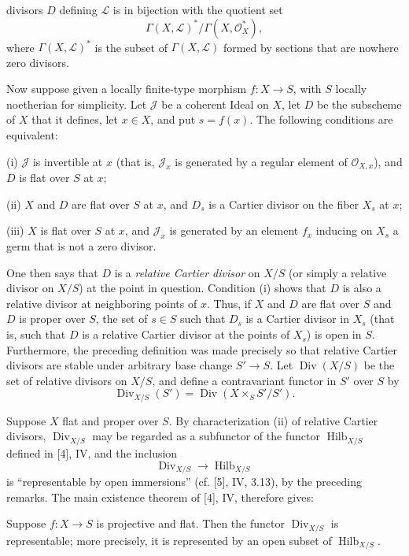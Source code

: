 divisors $D$ defining $\mathcal L$ is in bijection with the quotient set
\[
\Gamma(X,\mathcal L)^*/\Gamma(X,\mathcal O_X^*),
\]
where $\Gamma(X,\mathcal L)^*$ is the subset of $\Gamma(X,\mathcal L)$ formed
by sections that are nowhere zero divisors.

Now suppose given a locally finite-type morphism $f:X\longrightarrow S$, with
$S$ locally noetherian for simplicity. Let $\mathcal J$ be a coherent Ideal on
$X$, let $D$ be the subscheme of $X$ that it defines, let $x\in X$, and put
$s=f(x)$. The following conditions are equivalent:

\noindent (i) $\mathcal J$ is invertible at $x$ (that is, $\mathcal J_x$ is
generated by a regular element of $\mathcal O_{X,x}$), and $D$ is flat over
$S$ at $x$;

\noindent (ii) $X$ and $D$ are flat over $S$ at $x$, and $D_s$ is a Cartier
divisor on the fiber $X_s$ at $x$;

\noindent (iii) $X$ is flat over $S$ at $x$, and $\mathcal J_x$ is generated
by an element $f_x$ inducing on $X_s$ a germ that is not a zero divisor.

One then says that $D$ is a \emph{relative Cartier divisor} on $X/S$ (or simply
a relative divisor on $X/S$) at the point in question. Condition (i) shows
that $D$ is also a relative divisor at neighboring points of $x$. Thus, if $X$
and $D$ are flat over $S$ and $D$ is proper over $S$, the set of $s\in S$ such
that $D_s$ is a Cartier divisor in $X_s$ (that is, such that $D$ is a relative
Cartier divisor at the points of $X_s$) is open in $S$. Furthermore, the
preceding definition was made precisely so that relative Cartier divisors are
stable under arbitrary base change $S'\longrightarrow S$. Let
$\operatorname{Div}(X/S)$ be the set of relative divisors on $X/S$, and define
a contravariant functor in $S'$ over $S$ by
\[
\operatorname{Div}_{X/S}(S')=
\operatorname{Div}(X\times_SS'/S').
\]

Suppose $X$ flat and proper over $S$. By characterization (ii) of relative
Cartier divisors, $\operatorname{Div}_{X/S}$ may be regarded as a subfunctor of
the functor $\operatorname{Hilb}_{X/S}$ defined in [4], IV, and the inclusion
\[
\operatorname{Div}_{X/S}\longrightarrow\operatorname{Hilb}_{X/S}
\]
is “representable by open immersions” (cf. [5], IV, 3.13), by the preceding
remarks. The main existence theorem of [4], IV, therefore gives:

 Suppose $f:X\longrightarrow S$ is projective and
flat. Then the functor $\operatorname{Div}_{X/S}$ is representable; more
precisely, it is represented by an open subset of
$\operatorname{Hilb}_{X/S}$.

